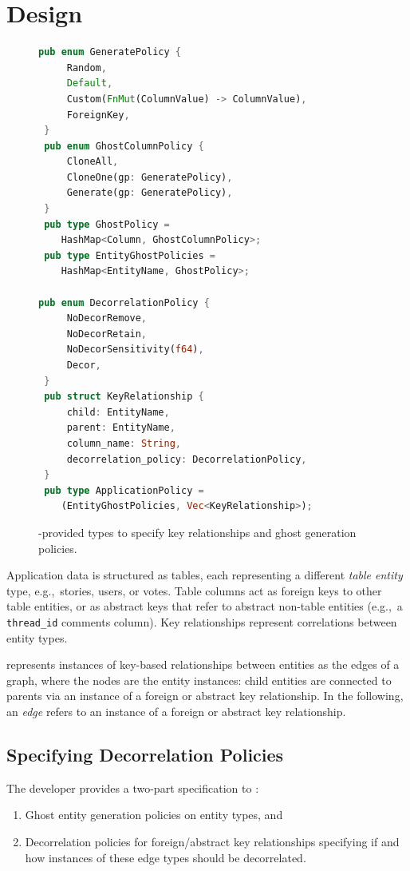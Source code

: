 \section{Design}
\begin{figure}
\begin{lstlisting}[language=Rust]
 pub enum GeneratePolicy {
     Random,
     Default,
     Custom(FnMut(ColumnValue) -> ColumnValue),
     ForeignKey, 
 }
 pub enum GhostColumnPolicy {
     CloneAll,
     CloneOne(gp: GeneratePolicy),
     Generate(gp: GeneratePolicy),
 }
 pub type GhostPolicy = 
    HashMap<Column, GhostColumnPolicy>;
 pub type EntityGhostPolicies = 
    HashMap<EntityName, GhostPolicy>;

pub enum DecorrelationPolicy {
     NoDecorRemove,
     NoDecorRetain,
     NoDecorSensitivity(f64),
     Decor,
 }
 pub struct KeyRelationship {
     child: EntityName,
     parent: EntityName,
     column_name: String,
     decorrelation_policy: DecorrelationPolicy,
 }
 pub type ApplicationPolicy = 
    (EntityGhostPolicies, Vec<KeyRelationship>);
\end{lstlisting}
    \caption{\sys{}-provided types to specify key relationships and ghost generation policies.}
\end{figure}


Application data is structured as tables, each representing a different \emph{table entity} type,
e.g.,\ stories, users, or votes. Table columns act as foreign keys to other table entities, or as
abstract keys that refer to abstract non-table entities (e.g.,\ a \texttt{thread\_id} comments column). 
Key relationships represent correlations between entity types.

\sys{} represents instances of key-based relationships between entities as the edges of a graph,
where the nodes are the entity instances: child entities are connected to parents via an instance of
a foreign or abstract key relationship. In the following, an \emph{edge} refers to an instance of a
foreign or abstract key relationship.

\subsection{Specifying Decorrelation Policies}
The developer provides a two-part specification to \sys{}: 
\begin{enumerate}
    \item Ghost entity generation policies on entity types, and
    \item Decorrelation policies for foreign/abstract key relationships specifying if and how
        instances of these edge types should be decorrelated.
\end{enumerate}

